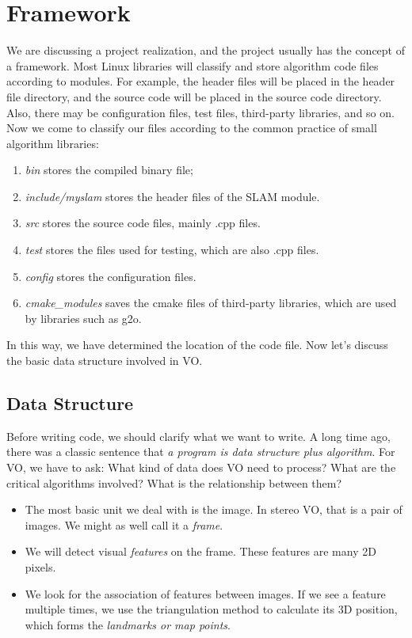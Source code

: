 \section{Framework}
We are discussing a project realization, and the project usually has the concept of a framework. Most Linux libraries will classify and store algorithm code files according to modules. For example, the header files will be placed in the header file directory, and the source code will be placed in the source code directory. Also, there may be configuration files, test files, third-party libraries, and so on. Now we come to classify our files according to the common practice of small algorithm libraries:

\begin{enumerate}
	\item \textit{bin} stores the compiled binary file;
	\item \textit{include/myslam} stores the header files of the SLAM module. 
	\item \textit{src} stores the source code files, mainly .cpp files.
	\item \textit{test} stores the files used for testing, which are also .cpp files.
	\item \textit{config} stores the configuration files.
	\item \textit{cmake\_modules} saves the cmake files of third-party libraries, which are used by libraries such as g2o.
\end{enumerate}

In this way, we have determined the location of the code file. Now let's discuss the basic data structure involved in VO.

\subsection{Data Structure}
Before writing code, we should clarify what we want to write. A long time ago, there was a classic sentence that \textit{a program is data structure plus algorithm}. For VO, we have to ask: What kind of data does VO need to process? What are the critical algorithms involved? What is the relationship between them?

\begin{itemize}
	\item The most basic unit we deal with is the image. In stereo VO, that is a pair of images. We might as well call it a \textit{frame}.
	\item We will detect visual \textit{features} on the frame. These features are many 2D pixels.
	\item We look for the association of features between images. If we see a feature multiple times, we use the triangulation method to calculate its 3D position, which forms the \textit{landmarks or map points}.
\end{itemize}

